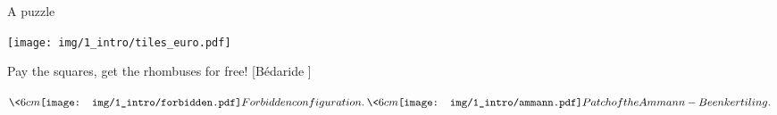 %
%		
%		
%
%		
%		
%

\begin{frame}{A puzzle}

\centering
\texttt{[image: img/1\_intro/tiles\_euro.pdf]}

Pay the squares, get the rhombuses for free! [Bédaride ]

\(
\<{6cm}
\centering
\texttt{[image: img/1\_intro/forbidden.pdf]}

Forbidden configuration.
\>

\<{6cm}
\centering
\texttt{[image: img/1\_intro/ammann.pdf]}

Patch of the Ammann-Beenker tiling.
\>
\)

\end{frame}
